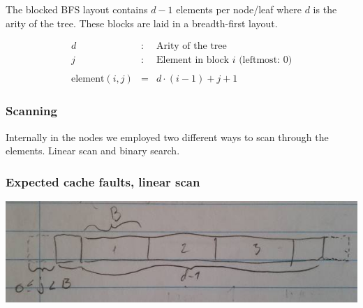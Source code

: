 The blocked BFS layout contains $d - 1$ elements per node/leaf where $d$ is the arity of the tree. These blocks are laid in a breadth-first layout.

\begin{eqnarray*}
d & : & \textrm{Arity of the tree} \\
j & : & \textrm{Element in block $i$ (leftmost: $0$)} \\
\\
\mathrm{element}(i, j) & = & d\cdot (i - 1) + j + 1
\end{eqnarray*}

\subsubsection*{Scanning}

Internally in the nodes we employed two different ways to scan through the elements. Linear scan and binary search.

\subsubsection*{Expected cache faults, linear scan}

\includegraphics[width=1\textwidth]{blocks}

